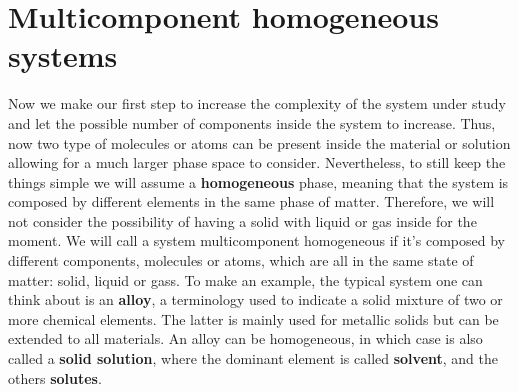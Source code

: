 \section{Multicomponent homogeneous systems}

Now we make our first step to increase the complexity of the system under study and let the possible number of components inside the system to increase. Thus, now two type of molecules or atoms can be present inside the material or solution allowing for a much larger phase space to consider. Nevertheless, to still keep the things simple we will assume a \textbf{homogeneous} phase, meaning that the system is composed by different elements in the same phase of matter. Therefore, we will not consider the possibility of having a solid with liquid or gas inside for the moment.
{
    We will call a system multicomponent homogeneous if it's composed by different components, molecules or atoms, which are all in the same state of matter: solid, liquid or gass.
}
\noindent
To make an example, the typical system one can think about is an \textbf{alloy}, a terminology used to indicate a solid mixture of two or more chemical elements. The latter is mainly used for metallic solids but can be extended to all materials. An alloy can be homogeneous, in which case is also called a \textbf{solid solution}, where the dominant element is called \textbf{solvent}, and the others \textbf{solutes}. 

